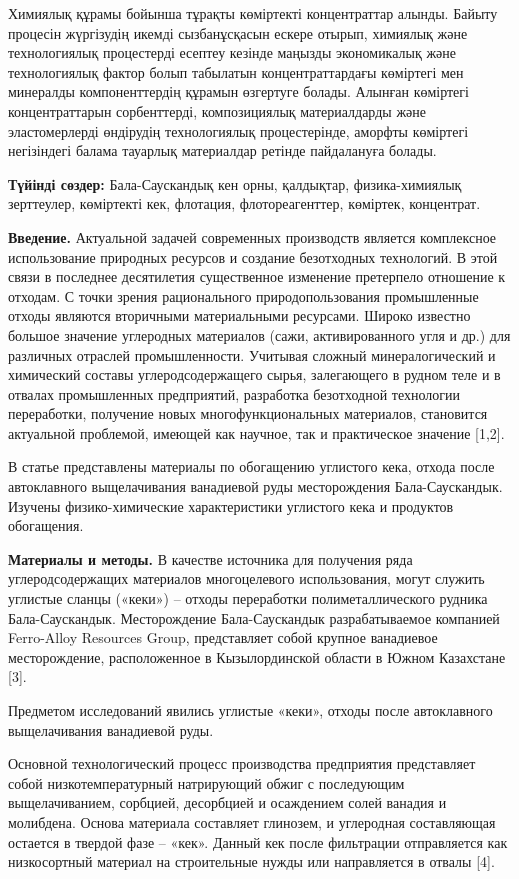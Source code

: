 Химиялық құрамы бойынша тұрақты көміртекті концентраттар алынды. Байыту
процесін жүргізудің икемді сызбанұсқасын ескере отырып, химиялық және
технологиялық процестерді есептеу кезінде маңызды экономикалық және
технологиялық фактор болып табылатын концентраттардағы көміртегі мен
минералды компоненттердің құрамын өзгертуге болады. Алынған көміртегі
концентраттарын сорбенттерді, композициялық материалдарды және
эластомерлерді өндірудің технологиялық процестерінде, аморфты көміртегі
негізіндегі балама тауарлық материалдар ретінде пайдалануға болады.

\textbf{Түйінді сөздер:} Бала-Саускандық кен орны, қалдықтар,
физика-химиялық зерттеулер, көміртекті кек, флотация, флотореагенттер,
көміртек, концентрат.

\textbf{Введение.} Актуальной задачей современных производств является
комплексное использование природных ресурсов и создание безотходных
технологий. В этой связи в последнее десятилетия существенное изменение
претерпело отношение к отходам. С точки зрения рационального
природопользования промышленные отходы являются вторичными материальными
ресурсами. Широко известно большое значение углеродных материалов (сажи,
активированного угля и др.) для различных отраслей промышленности.
Учитывая сложный минералогический и химический составы
углеродсодержащего сырья, залегающего в рудном теле и в отвалах
промышленных предприятий, разработка безотходной технологии переработки,
получение новых многофункциональных материалов, становится актуальной
проблемой, имеющей как научное, так и практическое значение {[}1,2{]}.

В статье представлены материалы по обогащению углистого кека, отхода
после автоклавного выщелачивания ванадиевой руды месторождения
Бала-Саускандык. Изучены физико-химические характеристики углистого кека
и продуктов обогащения.

\textbf{Материалы и методы.} В качестве источника для получения ряда
углеродсодержащих материалов многоцелевого использования, могут служить
углистые сланцы («кеки») -- отходы переработки полиметаллического
рудника Бала-Саускандык. Месторождение Бала-Саускандык разрабатываемое
компанией Ferro-Alloy Resources Group, представляет собой крупное
ванадиевое месторождение, расположенное в Кызылординской области в Южном
Казахстане {[}3{]}.

Предметом исследований явились углистые «кеки», отходы после
автоклавного выщелачивания ванадиевой руды.

Основной технологический процесс производства предприятия представляет
собой низкотемпературный натрирующий обжиг с последующим выщелачиванием,
сорбцией, десорбцией и осаждением солей ванадия и молибдена. Основа
материала составляет глинозем, и углеродная составляющая остается в
твердой фазе -- «кек». Данный кек после фильтрации отправляется как
низкосортный материал на строительные нужды или направляется в отвалы
{[}4{]}.

